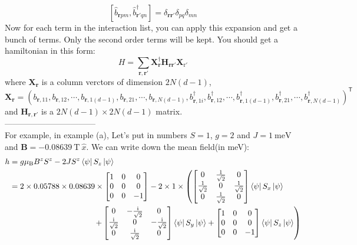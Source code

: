 \documentclass[letter]{article}
\newcommand{\ii}{\mathrm{i}}
\begin{document}
$$
\left[\hat{b}_{\bm{r}pm},\hat{b}^{\dagger}_{\bm{r}'qn}\right]=\delta_{\bm{r}\bm{r}'}\delta_{pq}\delta_{mn}$$
Now for each term in the interaction list, you can apply this expansion and get a bunch of terms. Only the second order terms will be kept. You should get a hamiltonian in this form:
 $$H=\sum_{\bm{r},\bm{r}'}\mathbf{X}^{\dagger}_{\bm{r}}\mathbf{H}_{\bm{r}\bm{r}'}\mathbf{X}_{\mathrm{r}'}$$
 where $\mathbf{X}_{\bm{r}}$ is a column verctors of dimension $2N(d-1)$, $$\mathbf{X}_{\bm{r}}=\left(b_{\bm{r},11},b_{\bm{r},12},\cdots,b_{\bm{r},1(d-1)},b_{\bm{r},21},\cdots,b_{\bm{r},N(d-1)},b_{\bm{r},1i}^{\dagger},b_{\bm{r},12}^{\dagger},\cdots,b_{\bm{r},1(d-1)}^{\dagger},b_{\bm{r},21}^{\dagger},\cdots,b_{\bm{r},N(d-1)}^{\dagger}\right)^{\mathsf{T}}$$
and $\mathbf{H}_{\bm{r},\bm{r}'}$ is a $2N(d-1)\times 2N(d-1)$ matrix.\\
---------------------------------\\
 For example, in example (a), Let's put in numbers $S=1$, $g=2$ and $J=\SI{1}{\milli\electronvolt}$
and $\bm{B}=-\SI{0.08639}{\tesla}\ \hat{x}.$ We can write down the mean field(in meV):
$$\begin{aligned}
    h&=  g\mu_{\mathrm{B}} B^z S^z-2J S^z \left<\psi\right|S_z\left|\psi\right>\\
    & = 2\times 0.05788\times 0.08639\times  \begin{bmatrix}
        1 & 0 & 0\\
       0 &  0 & 0\\
        0& 0 & -1
        \end{bmatrix}-2\times1\times\left( \begin{bmatrix}
            0 & \frac{1}{\sqrt{2}} & 0\\
            \frac{1}{\sqrt{2}} &  0 &\frac{1}{\sqrt{2}}\\
        0& \frac{1}{\sqrt{2}}& 0
            \end{bmatrix} \left<\psi\right|S_x\left|\psi\right>\right.\\
           & {\ \ \ \ \ \ \ \ \ \ \ \ \ \ }\indent \indent\indent\indent\left.+\begin{bmatrix}
                0& -\frac{\ii}{\sqrt{2}} & 0\\
                \frac{\ii}{\sqrt{2}} &  0 & -\frac{\ii}{\sqrt{2}}\\
            0& \frac{\ii}{\sqrt{2}}&0
                \end{bmatrix} \left<\psi\right|S_y\left|\psi\right>+\begin{bmatrix}
            1 & 0 & 0\\
        0 &  0 & 0\\
        0& 0&-1
            \end{bmatrix} \left<\psi\right|S_z\left|\psi\right>\right)
\end{aligned}$$
\end{document}
